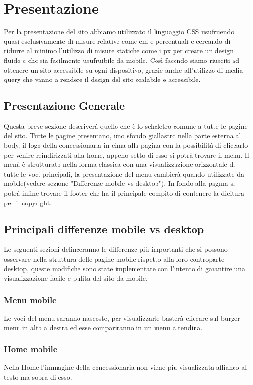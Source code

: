 \section{Presentazione}
    Per la presentazione del sito abbiamo utilizzato il linguaggio CSS usufruendo quasi esclusivamente di misure relative come em e percentuali e cercando di ridurre al minimo l'utilizzo di misure statiche come i px per creare un design fluido e che sia facilmente usufruibile da mobile.
    Così facendo siamo riusciti ad ottenere un sito accessibile su ogni dispositivo, grazie anche all'utilizzo di media query che vanno a rendere il design del sito scalabile e accessibile.
    
    \subsection{Presentazione Generale}
    Questa breve sezione descriverà quello che è lo scheletro comune a tutte le pagine del sito.
    Tutte le pagine presentano, uno sfondo giallastro nella parte esterna al body, il logo della concessionaria in cima alla pagina con la possibilità di cliccarlo per venire reindirizzati alla home, appeno sotto di esso si potrà trovare il menu. Il menù è strutturato nella forma classica con una visualizzazione orizzontale di tutte le voci principali, la presentazione del menu cambierà quando utilizzato da mobile(vedere sezione "Differenze mobile vs desktop"). In fondo alla pagina si potrà infine trovare il footer che ha il principale compito di contenere la dicitura per il copyright. %

    \subsection{Principali differenze mobile vs desktop}
    Le seguenti sezioni delineeranno le differenze più importanti che si possono osservare nella struttura delle pagine mobile rispetto alla loro controparte desktop, queste modifiche sono state implementate con l'intento di garantire una visualizzazione facile e pulita del sito da mobile.

        \subsubsection{Menu mobile}
        Le voci del menu saranno nascoste, per visualizzarle basterà cliccare sul burger menu in alto a destra ed esse compariranno in un menu a tendina.

        \subsubsection{Home mobile}
        Nella Home l'immagine della concessionaria non viene più visualizzata affianco al testo ma sopra di esso.

